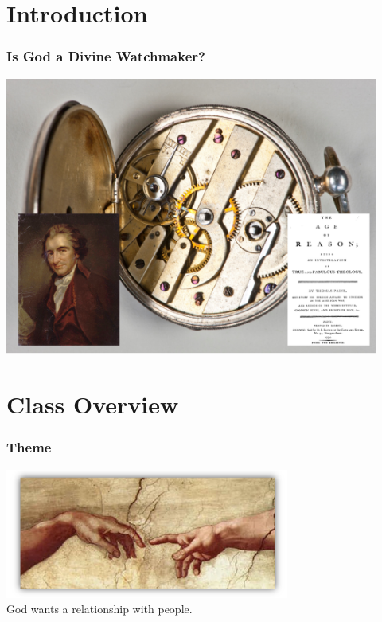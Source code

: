 
\section{Introduction}

\begin{frame}
\frametitle{Is God a Divine Watchmaker?}
\begin{center}
\includegraphics[width=0.92\textwidth]{figures/deism.png}
\end{center}
\end{frame}


\section{Class Overview}
\begin{frame}
\frametitle{Theme}
\begin{center}
\includegraphics[width=0.7\textwidth]{figures/creation_of_adam.png}\\\vspace{1em}
\Large God wants a relationship with people.

\end{center}
\end{frame}

